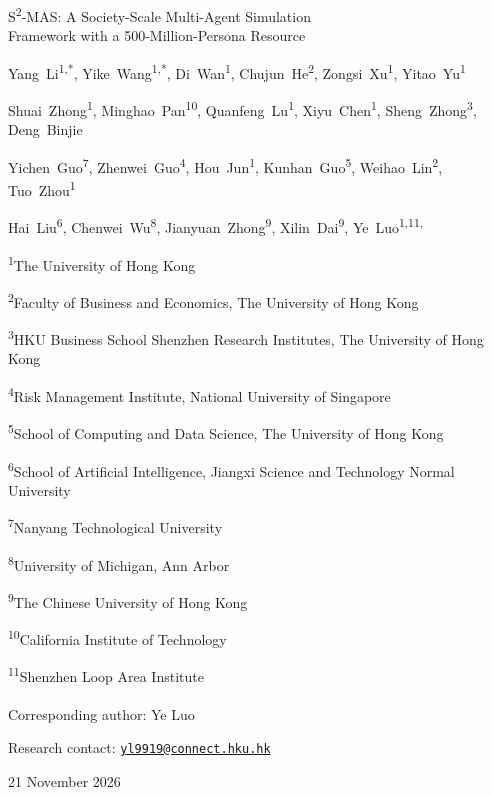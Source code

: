 \documentclass[10pt]{article}
\begin{document}
\begin{center}
{\LARGE S\textsuperscript{2}-MAS: A Society-Scale Multi-Agent Simulation\\Framework with a 500-Million-Persona Resource\par}
\vspace{7pt}
{\fontsize{10.5}{13}\selectfont
Yang~Li\textsuperscript{1,*}, Yike~Wang\textsuperscript{1,*}, Di~Wan\textsuperscript{1}, Chujun~He\textsuperscript{2}, Zongsi~Xu\textsuperscript{1}, Yitao~Yu\textsuperscript{1}\par
Shuai~Zhong\textsuperscript{1}, Minghao~Pan\textsuperscript{10}, Quanfeng~Lu\textsuperscript{1}, Xiyu~Chen\textsuperscript{1}, Sheng~Zhong\textsuperscript{3}, Deng~Binjie\par
Yichen~Guo\textsuperscript{7}, Zhenwei~Guo\textsuperscript{4}, Hou~Jun\textsuperscript{1}, Kunhan~Guo\textsuperscript{5}, Weihao~Lin\textsuperscript{2}, Tuo~Zhou\textsuperscript{1}\par
Hai~Liu\textsuperscript{6}, Chenwei~Wu\textsuperscript{8}, Jianyuan~Zhong\textsuperscript{9}, Xilin~Dai\textsuperscript{9}, Ye~Luo\textsuperscript{1,11,\textdagger}\par
}\vspace{5pt}
{\fontsize{8.4}{10.2}\selectfont
\textsuperscript{1}The University of Hong Kong\par
\textsuperscript{2}Faculty of Business and Economics, The University of Hong Kong\par
\textsuperscript{3}HKU Business School Shenzhen Research Institutes, The University of Hong Kong\par
\textsuperscript{4}Risk Management Institute, National University of Singapore\par
\textsuperscript{5}School of Computing and Data Science, The University of Hong Kong\par
\textsuperscript{6}School of Artificial Intelligence, Jiangxi Science and Technology Normal University\par
\textsuperscript{7}Nanyang Technological University\par
\textsuperscript{8}University of Michigan, Ann Arbor\par
\textsuperscript{9}The Chinese University of Hong Kong\par
\textsuperscript{10}California Institute of Technology\par
\textsuperscript{11}Shenzhen Loop Area Institute\par
\vspace{3pt}\textsuperscript{\textdagger}Corresponding author: Ye Luo\par
Research contact: \href{mailto:yl9919@connect.hku.hk}{\nolinkurl{yl9919@connect.hku.hk}}\par
}\vspace{5pt}
\vspace{7pt}
{\small 21 November 2026\par}
\end{center}
\end{document}
